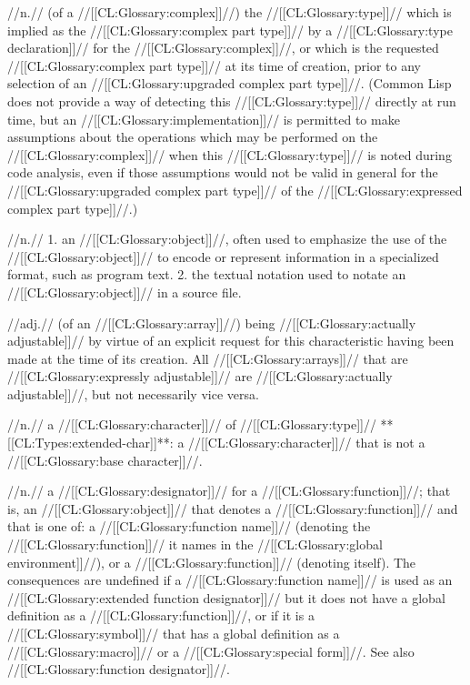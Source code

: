  //n.// (of a //[[CL:Glossary:complex]]//) the //[[CL:Glossary:type]]// which is implied as the //[[CL:Glossary:complex part type]]// by a //[[CL:Glossary:type declaration]]// for the //[[CL:Glossary:complex]]//, or which is the requested //[[CL:Glossary:complex part type]]// at its time of creation, prior to any selection of an //[[CL:Glossary:upgraded complex part type]]//. (Common Lisp does not provide a way of detecting this //[[CL:Glossary:type]]// directly at run time, but an //[[CL:Glossary:implementation]]// is permitted to make assumptions about the operations which may be performed on the //[[CL:Glossary:complex]]// when this //[[CL:Glossary:type]]// is noted during code analysis, even if those assumptions would not be valid in general for the //[[CL:Glossary:upgraded complex part type]]// of the //[[CL:Glossary:expressed complex part type]]//.)

 //n.// 1. an //[[CL:Glossary:object]]//, often used to emphasize the use of the //[[CL:Glossary:object]]// to encode or represent information in a specialized format, such as program text.  2. the textual notation used to notate an //[[CL:Glossary:object]]// in a source file. 

 //adj.// (of an //[[CL:Glossary:array]]//) being //[[CL:Glossary:actually adjustable]]// by virtue of an explicit request for this characteristic having been made at the time of its creation. All //[[CL:Glossary:arrays]]// that are //[[CL:Glossary:expressly adjustable]]// are //[[CL:Glossary:actually adjustable]]//, but not necessarily vice versa.

 //n.// a //[[CL:Glossary:character]]// 
 of //[[CL:Glossary:type]]// **[[CL:Types:extended-char]]**: a //[[CL:Glossary:character]]// that is not a //[[CL:Glossary:base character]]//.

 //n.// a //[[CL:Glossary:designator]]// for a //[[CL:Glossary:function]]//; that is, an //[[CL:Glossary:object]]// that denotes a //[[CL:Glossary:function]]// and that is one of: a //[[CL:Glossary:function name]]// (denoting the //[[CL:Glossary:function]]// it names in the //[[CL:Glossary:global environment]]//), or a //[[CL:Glossary:function]]// (denoting itself). The consequences are undefined if a //[[CL:Glossary:function name]]// is used as an //[[CL:Glossary:extended function designator]]// but it does not have a global definition as a //[[CL:Glossary:function]]//, or if it is a //[[CL:Glossary:symbol]]// that has a global definition as a //[[CL:Glossary:macro]]// or a //[[CL:Glossary:special form]]//. See also //[[CL:Glossary:function designator]]//.

